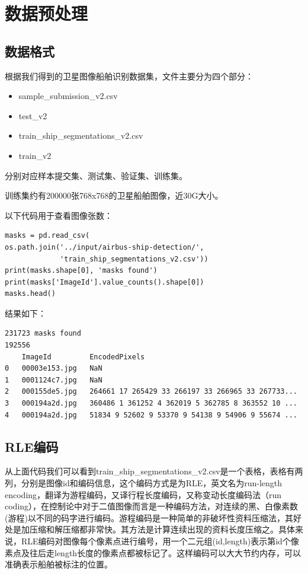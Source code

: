
\chapter{数据预处理}

\section{数据格式}

根据我们得到的卫星图像船舶识别数据集，文件主要分为四个部分：

\begin{itemize}
\tightlist
\item
  sample\_submission\_v2.csv
\item
  test\_v2
\item
  train\_ship\_segmentations\_v2.csv
\item
  train\_v2
\end{itemize}

分别对应样本提交集、测试集、验证集、训练集。

训练集约有200000张768x768的卫星船舶图像，近30G大小。

以下代码用于查看图像张数：

\begin{lstlisting}
masks = pd.read_csv(
os.path.join('../input/airbus-ship-detection/',
             'train_ship_segmentations_v2.csv'))
print(masks.shape[0], 'masks found')
print(masks['ImageId'].value_counts().shape[0])
masks.head()
\end{lstlisting}

结果如下：

\begin{verbatim}
231723 masks found
192556
    ImageId         EncodedPixels
0   00003e153.jpg   NaN
1   0001124c7.jpg   NaN
2   000155de5.jpg   264661 17 265429 33 266197 33 266965 33 267733...
3   000194a2d.jpg   360486 1 361252 4 362019 5 362785 8 363552 10 ...
4   000194a2d.jpg   51834 9 52602 9 53370 9 54138 9 54906 9 55674 ...
\end{verbatim}

\section{RLE编码}

从上面代码我们可以看到train\_ship\_segmentations\_v2.csv是一个表格，表格有两列，分别是图像id和编码信息，这个编码方式是为RLE，英文名为run-length
encoding，翻译为游程编码，又译行程长度编码，又称变动长度编码法（run
coding），在控制论中对于二值图像而言是一种编码方法，对连续的黑、白像素数(游程)以不同的码字进行编码。游程编码是一种简单的非破坏性资料压缩法，其好处是加压缩和解压缩都非常快。其方法是计算连续出现的资料长度压缩之。具体来说，RLE编码对图像每个像素点进行编号，用一个二元组(id,length)表示第id个像素点及往后走length长度的像素点都被标记了。这样编码可以大大节约内存，可以准确表示船舶被标注的位置。


